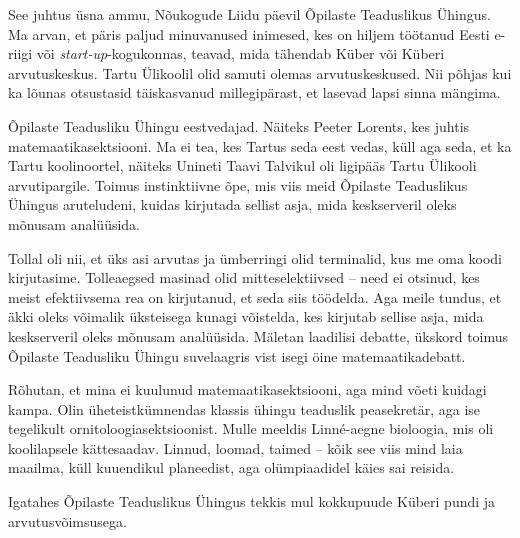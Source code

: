 

See juhtus üsna ammu, Nõukogude Liidu päevil 
Õpilaste Teaduslikus Ühingus. Ma arvan, et 
päris paljud minuvanused inimesed, kes on hiljem töötanud Eesti e-riigi või 
\emph{start-up}-kogukonnas, teavad, mida tähendab 
Küber või Küberi arvutuskeskus. Tartu 
Ülikoolil olid samuti olemas arvutuskeskused. Nii põhjas 
kui ka lõunas otsustasid täiskasvanud millegipärast, et lasevad lapsi sinna 
mängima. 


Õpilaste Teadusliku Ühingu eestvedajad. Näiteks Peeter 
Lorents, kes juhtis matemaatikasektsiooni. Ma ei tea, kes Tartus seda eest vedas, küll aga seda, et ka Tartu 
koolinoortel, näiteks Unineti Taavi Talvikul oli ligipääs Tartu Ülikooli arvutipargile. Toimus instinktiivne 
õpe, mis viis meid Õpilaste Teaduslikus Ühingus aruteludeni, 
kuidas kirjutada sellist asja, mida keskserveril oleks mõnusam analüüsida. 

Tollal oli nii, et üks asi arvutas ja ümberringi olid terminalid, kus me 
oma koodi kirjutasime. Tolleaegsed masinad olid mitteselektiivsed -- 
need ei otsinud, kes meist efektiivsema rea on kirjutanud, et seda siis 
töödelda. Aga meile tundus, et äkki oleks võimalik üksteisega kunagi 
võistelda, kes kirjutab sellise asja, mida keskserveril 
oleks mõnusam analüüsida. Mäletan laadilisi debatte, ükskord toimus
Õpilaste Teadusliku Ühingu suvelaagris vist isegi öine matemaatikadebatt. 

Rõhutan, et mina ei kuulunud matemaatikasektsiooni, aga mind võeti kuidagi 
kampa. Olin üheteistkümnendas klassis ühingu 
teaduslik peasekretär, aga ise tegelikult 
ornitoloogiasektsioonist. Mulle meeldis Linné-aegne 
bioloogia, mis oli 
koolilapsele kättesaadav. Linnud, loomad, taimed -- kõik see viis mind 
laia maailma, küll kuuendikul planeedist, aga olümpiaadidel käies
sai reisida. 

Igatahes Õpilaste Teaduslikus Ühingus tekkis mul kokkupuude Küberi pundi ja 
arvutusvõimsusega.

